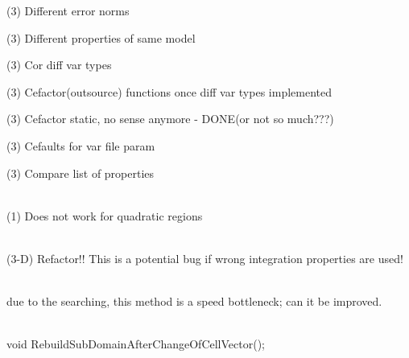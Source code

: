 \begin{DoxyRefList}
(3) Different error norms 



(3) Different properties of same model 



(3) Cor diff var types 



(3) Cefactor(outsource) functions once diff var types implemented 



(3) Cefactor static, no sense anymore -\/ DONE(or not so much???) 



(3) Cefaults for var file param 



(3) Compare list of properties  
\item[Member \doxylink{classcsmp_1_1_model_sub_domain_a558d771a7d76ff360397d9c2383d89fc}{csmp\+::Model\+Sub\+Domain\texorpdfstring{$<$}{<} dim, CELL \texorpdfstring{$>$}{>}\+::Identify\+Perimeter} ()]\hfill \\
\label{todo__todo000168}%
%
(1) Does not work for quadratic regions 
\item[Member \doxylink{classcsmp_1_1_model_sub_domain_a75a4cf21feddd36d999043a1451dabce}{csmp\+::Model\+Sub\+Domain\texorpdfstring{$<$}{<} dim, CELL \texorpdfstring{$>$}{>}\+::Input\+Property\+Value} (const char \texorpdfstring{$\ast$}{*}input\+\_\+prop, const Var \&new\+\_\+value, \doxylink{namespacecsmp_a4b8f1ad9f1a09a957714679ce72aee3f}{SUBDOMAIN\+\_\+\+PART} sd=COMPLETE)]\hfill \\
\label{todo__todo000171}%
%
(3-\/D) Refactor!! This is a potential bug if wrong integration properties are used!  
\item[Member \doxylink{classcsmp_1_1_model_sub_domain_a9d850f869aa6838cecb95fb492a02568}{csmp\+::Model\+Sub\+Domain\texorpdfstring{$<$}{<} dim, CELL \texorpdfstring{$>$}{>}\+::Partition\+Cell\+Vector} ()]\hfill \\
\label{todo__todo000169}%
%
due to the searching, this method is a speed bottleneck; can it be improved.  
\item[Class \doxylink{classcsmp_1_1_model_sub_domain___test}{csmp\+::Model\+Sub\+Domain\+\_\+\+Test} ]\hfill \\
\label{todo__todo000251}%
%
void Rebuild\+Sub\+Domain\+After\+Change\+Of\+Cell\+Vector(); 
\item[Class \doxylink{classcsmp_1_1_mohr_coulomb_failure___visitor}{csmp\+::Mohr\+Coulomb\+Failure\+\_\+\+Visitor\texorpdfstring{$<$}{<} dim \texorpdfstring{$>$}{>}} ]\hfill \\

\end{DoxyRefList}

